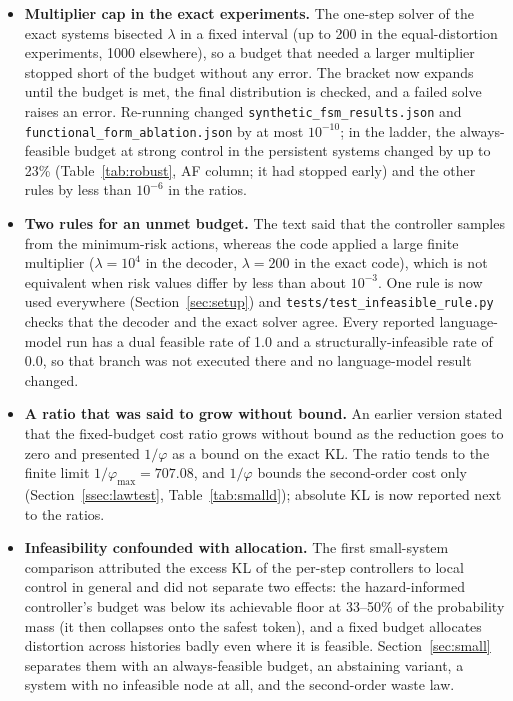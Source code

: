 \documentclass[make,article,submit,pdftex]{Definitions/mdpi}
\begin{document}
\begin{itemize}[leftmargin=*]
\item \textbf{Multiplier cap in the exact experiments.} The one-step solver of the exact systems bisected $\lambda$ in a fixed interval (up to 200 in the equal-distortion experiments, 1000 elsewhere), so a budget that needed a larger multiplier stopped short of the budget without any error. The bracket now expands until the budget is met, the final distribution is checked, and a failed solve raises an error. Re-running changed \texttt{synthetic\_\allowbreak{}fsm\_\allowbreak{}results.json} and \texttt{functional\_\allowbreak{}form\_\allowbreak{}ablation.json} by at most $10^{-10}$; in the ladder, the always-feasible budget at strong control in the persistent systems changed by up to 23\% (Table~\ref{tab:robust}, AF column; it had stopped early) and the other rules by less than $10^{-6}$ in the ratios.
  \item \textbf{Two rules for an unmet budget.} The text said that the controller samples from the minimum-risk actions, whereas the code applied a large finite multiplier ($\lambda=10^{4}$ in the decoder, $\lambda=200$ in the exact code), which is not equivalent when risk values differ by less than about $10^{-3}$. One rule is now used everywhere (Section~\ref{sec:setup}) and \texttt{tests/test\_\allowbreak{}infeasible\_\allowbreak{}rule.py} checks that the decoder and the exact solver agree. Every reported language-model run has a dual feasible rate of 1.0 and a structurally-infeasible rate of 0.0, so that branch was not executed there and no language-model result changed.
  \item \textbf{A ratio that was said to grow without bound.} An earlier version stated that the fixed-budget cost ratio grows without bound as the reduction goes to zero and presented $1/\varphi$ as a bound on the exact KL. The ratio tends to the finite limit $1/\varphi_{\max}=707.08$, and $1/\varphi$ bounds the second-order cost only (Section~\ref{ssec:lawtest}, Table~\ref{tab:smalld}); absolute KL is now reported next to the ratios.
  \item \textbf{Infeasibility confounded with allocation.} The first small-system comparison attributed the excess KL of the per-step controllers to local control in general and did not separate two effects: the hazard-informed controller's budget was below its achievable floor at 33--50\% of the probability mass (it then collapses onto the safest token), and a fixed budget allocates distortion across histories badly even where it is feasible. Section~\ref{sec:small} separates them with an always-feasible budget, an abstaining variant, a system with no infeasible node at all, and the second-order waste law.
\end{itemize}
\end{document}
